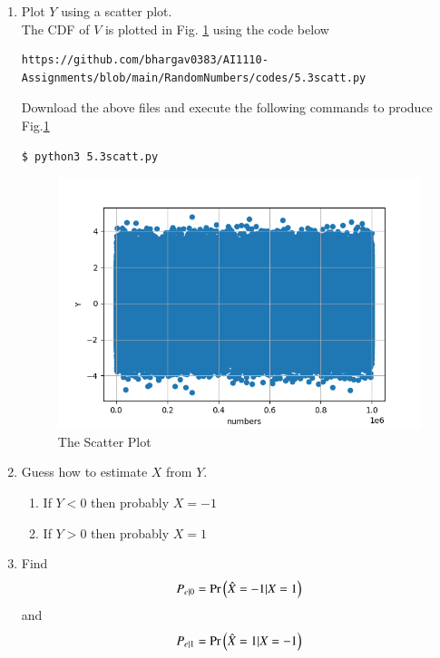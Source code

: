 \documentclass[journal,12pt,twocolumn]{IEEEtran}
\renewcommand\thesection{\arabic{section}}
\begin{document}
\begin{enumerate}[label=\thesection.\arabic*
,ref=\thesection.\theenumi]
\item Plot $Y$ using a scatter plot.\\
\solution
The CDF of $V$ is plotted in Fig. \ref{fig:5.3} using the code below
\begin{lstlisting}
https://github.com/bhargav0383/AI1110-Assignments/blob/main/RandomNumbers/codes/5.3scatt.py
\end{lstlisting}
Download the above files and execute the following commands to produce Fig.\ref{fig:5.3}
\begin{lstlisting}
$ python3 5.3scatt.py
\end{lstlisting}
\begin{figure}[!h]
\centering
\includegraphics[width=\columnwidth]{./figs/5.3scatt.png}
\caption{The Scatter Plot}
\label{fig:5.3}
\end{figure}
\item Guess how to estimate $X$ from $Y$.\\
\solution
\begin{enumerate}
	    \item If $Y<0$ then probably $X=-1$
	    \item If $Y>0$ then probably $X=1$
	\end{enumerate}
\item
\label{ml-ch4_sim}
Find 
\begin{equation}
	P_{e|0} = \Pr\left(\hat{X} = -1|X=1\right)
\end{equation}
and 
\begin{equation}
	P_{e|1} = \Pr\left(\hat{X} = 1|X=-1\right)
\end{equation}

\end{enumerate}
\end{document}
